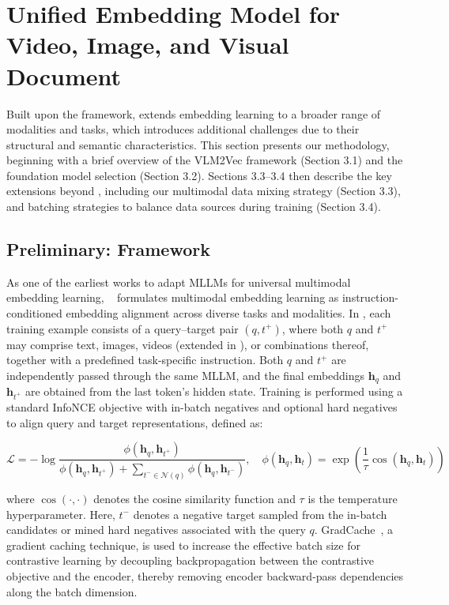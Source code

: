 \section{Unified Embedding Model for Video, Image, and Visual Document}

Built upon the \vlmvec framework, \model extends embedding learning to a broader range of modalities and tasks, which introduces additional challenges due to their structural and semantic characteristics.
This section presents our methodology, beginning with a brief overview of the VLM2Vec framework (Section 3.1) and the foundation model selection (Section 3.2). Sections 3.3–3.4 then describe the key extensions beyond \vlmvec, including our multimodal data mixing strategy (Section 3.3), and batching strategies to balance data sources during training (Section 3.4).

\subsection{Preliminary: \vlmvec Framework}

As one of the earliest works to adapt MLLMs for universal multimodal embedding learning, \vlmvec~\citep{vlm2vec} formulates multimodal embedding learning as instruction-conditioned embedding alignment across diverse tasks and modalities. In \vlmvec, each training example consists of a query--target pair $(q, t^+)$, where both $q$ and $t^+$ may comprise text, images, videos (extended in \model), or combinations thereof, together with a predefined task-specific instruction. Both $q$ and $t^+$ are independently passed through the same MLLM, and the final embeddings $\mathbf{h}_q$ and $\mathbf{h}_{t^+}$ are obtained from the last token’s hidden state. Training is performed using a standard InfoNCE objective with in-batch negatives and optional hard negatives to align query and target representations, defined as:


\begin{equation}
\mathcal{L}
= -\log 
\frac{\phi(\mathbf{h}_{q}, \mathbf{h}_{t^+})}
{\phi(\mathbf{h}_{q}, \mathbf{h}_{t^+})
+ \sum_{t^- \in \mathcal{N}(q)}
\phi(\mathbf{h}_{q}, \mathbf{h}_{t^-})},
\quad
\phi(\mathbf{h}_q, \mathbf{h}_t)
=
\exp\!\left(\frac{1}{\tau}
\cos(\mathbf{h}_q, \mathbf{h}_t)\right)
\label{eq:infonce}
\end{equation}


where $\cos(\cdot,\cdot)$ denotes the cosine similarity function and $\tau$ is the temperature hyperparameter. Here, $t^-$ denotes a negative target sampled from the in-batch candidates or mined hard negatives associated with the query $q$.
GradCache~\citep{gradcache}, a gradient caching technique, is used to increase the effective batch size for contrastive learning by decoupling backpropagation between the contrastive objective and the encoder, thereby removing encoder backward-pass dependencies along the batch dimension.


